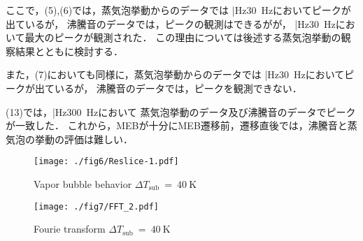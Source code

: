 ここで，(5),(6)では，蒸気泡挙動からのデータでは
|Hz\SI{30}{~Hz}においてピークが出ているが，
沸騰音のデータでは，ピークの観測はできるがが，
|Hz\SI{30}{~Hz}において最大のピークが観測された．
この理由については後述する蒸気泡挙動の観察結果とともに検討する．

また，(7)においても同様に，蒸気泡挙動からのデータでは
|Hz\SI{30}{~Hz}においてピークが出ているが，
沸騰音のデータでは，ピークを観測できない．

(13)では，|Hz\SI{300}{~Hz}において
蒸気泡挙動のデータ及び沸騰音のデータでピークが一致した．
これから，MEBが十分にMEB遷移前，遷移直後では，沸騰音と蒸気泡の挙動の評価は難しい．



\begin{figure}[btp]
  \centering
  \texttt{[image: ./fig6/Reslice-1.pdf]}
  \caption{Vapor bubble behavior $\Delta T_{\mathrm{sub}}~=~40~\mathrm{K}$}
  \label{Reslice}
\end{figure}

\begin{figure}[btp]
  \centering
  \texttt{[image: ./fig7/FFT\_2.pdf]}
  \caption{Fourie transform $\Delta T_{\mathrm{sub}}~=~40~\mathrm{K}$}
  \label{FFT_2}
\end{figure}
